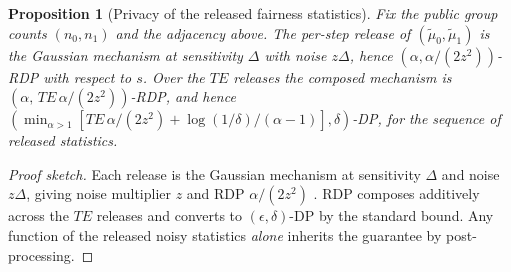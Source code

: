 \documentclass[pdflatex,sn-mathphys-num]{sn-jnl}
\theoremstyle{thmstyleone}%
\newtheorem{proposition}[theorem]{Proposition}%
\theoremstyle{thmstyletwo}%
\theoremstyle{thmstylethree}%
\begin{document}
\begin{proposition}[Privacy of the released fairness statistics]
Fix the public group counts $(n_0,n_1)$ and the adjacency above. The per-step
release of $(\tilde{\mu}_0,\tilde{\mu}_1)$ is the Gaussian mechanism at
sensitivity $\Delta$ with noise $z\Delta$, hence $(\alpha,\alpha/(2z^2))$-RDP
with respect to $s$. Over the $TE$ releases the composed mechanism is
$(\alpha,\,TE\,\alpha/(2z^2))$-RDP, and hence
$(\min_{\alpha>1}[TE\,\alpha/(2z^2)+\log(1/\delta)/(\alpha-1)],\delta)$-DP,
for the sequence of released statistics.
\end{proposition}
\begin{proof}[Proof sketch]
Each release is the Gaussian mechanism at sensitivity $\Delta$ and noise
$z\Delta$, giving noise multiplier $z$ and RDP $\alpha/(2z^2)$
\cite{mironov2017renyi}. RDP composes additively across the $TE$ releases and
converts to $(\epsilon,\delta)$-DP by the standard bound. Any function of the
released noisy statistics \emph{alone} inherits the guarantee by
post-processing.
\end{proof}
\end{document}
